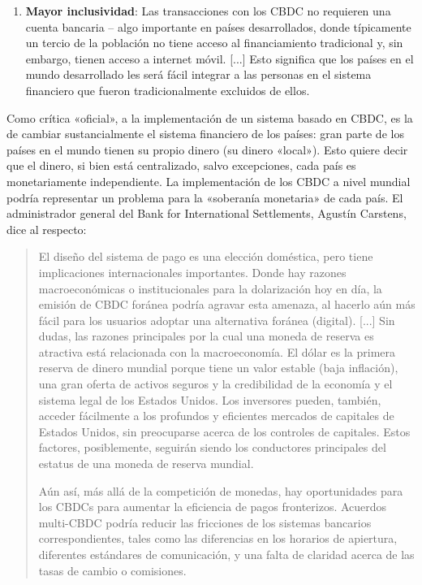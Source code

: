 \documentclass[12pt,a4paper,twoside]{book}
\begin{document}
\begin{enumerate}
\item \textbf{Mayor inclusividad}: Las transacciones con los CBDC no requieren una cuenta bancaria – algo importante en países desarrollados, donde típicamente un tercio de la población no tiene acceso al financiamiento tradicional y, sin embargo, tienen acceso a internet móvil. [...] Esto significa que los países en el mundo desarrollado les será fácil integrar a las personas en el sistema financiero que fueron tradicionalmente excluidos de ellos.
\end{enumerate}

Como crítica «oficial», a la implementación de un sistema basado en CBDC, es la de cambiar sustancialmente el sistema financiero de los países: gran parte de los países en el mundo tienen su propio dinero (su dinero «local»). Esto quiere decir que el dinero, si bien está centralizado, salvo excepciones, cada país es monetariamente independiente. La implementación de los CBDC a nivel mundial podría representar un problema para la «soberanía monetaria» de cada país. El administrador general del Bank for International Settlements, Agustín Carstens, dice al respecto:

\begin{quotation}
El diseño del sistema de pago es una elección doméstica, pero tiene implicaciones internacionales importantes. Donde hay razones macroeconómicas o institucionales para la dolarización hoy en día, la emisión de CBDC foránea podría agravar esta amenaza, al hacerlo aún más fácil para los usuarios adoptar una alternativa foránea (digital). [...] Sin dudas, las razones principales por la cual una moneda de reserva es atractiva está relacionada con la macroeconomía. El dólar es la primera reserva de dinero mundial porque tiene un valor estable (baja inflación), una gran oferta de activos seguros y la credibilidad de la economía y el sistema legal de los Estados Unidos. Los inversores pueden, también, acceder fácilmente a los profundos y eficientes mercados de capitales de Estados Unidos, sin preocuparse acerca de los controles de capitales. Estos factores, posiblemente, seguirán siendo los conductores principales del estatus de una moneda de reserva mundial.

Aún así, más allá de la competición de monedas, hay oportunidades para los CBDCs para aumentar la eficiencia de pagos fronterizos. Acuerdos multi-CBDC podría reducir las fricciones de los sistemas bancarios correspondientes, tales como las diferencias en los horarios de apiertura, diferentes estándares de comunicación, y una falta de claridad acerca de las tasas de cambio o comisiones. \cite[págs. 15-16]{CBDC:dolarizacion}
\end{quotation}
\end{document}
